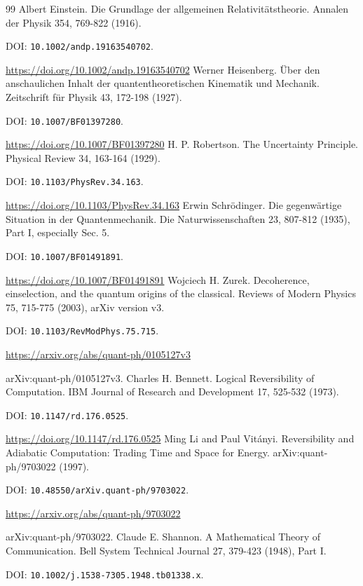 \clearpage
{}
\begin{thebibliography}{99}
Albert Einstein. Die Grundlage der allgemeinen Relativitätstheorie. Annalen der Physik 354, 769-822 (1916).
\par DOI: \nolinkurl{10.1002/andp.19163540702}.
\par\url{https://doi.org/10.1002/andp.19163540702}
Werner Heisenberg. Über den anschaulichen Inhalt der quantentheoretischen Kinematik und Mechanik. Zeitschrift für Physik 43, 172-198 (1927).
\par DOI: \nolinkurl{10.1007/BF01397280}.
\par\url{https://doi.org/10.1007/BF01397280}
H. P. Robertson. The Uncertainty Principle. Physical Review 34, 163-164 (1929).
\par DOI: \nolinkurl{10.1103/PhysRev.34.163}.
\par\url{https://doi.org/10.1103/PhysRev.34.163}
Erwin Schrödinger. Die gegenwärtige Situation in der Quantenmechanik. Die Naturwissenschaften 23, 807-812 (1935), Part I, especially Sec. 5.
\par DOI: \nolinkurl{10.1007/BF01491891}.
\par\url{https://doi.org/10.1007/BF01491891}
Wojciech H. Zurek. Decoherence, einselection, and the quantum origins of the classical. Reviews of Modern Physics 75, 715-775 (2003), arXiv version v3.
\par DOI: \nolinkurl{10.1103/RevModPhys.75.715}.
\par\url{https://arxiv.org/abs/quant-ph/0105127v3}
\par arXiv:quant-ph/0105127v3.
Charles H. Bennett. Logical Reversibility of Computation. IBM Journal of Research and Development 17, 525-532 (1973).
\par DOI: \nolinkurl{10.1147/rd.176.0525}.
\par\url{https://doi.org/10.1147/rd.176.0525}
Ming Li and Paul Vitányi. Reversibility and Adiabatic Computation: Trading Time and Space for Energy. arXiv:quant-ph/9703022 (1997).
\par DOI: \nolinkurl{10.48550/arXiv.quant-ph/9703022}.
\par\url{https://arxiv.org/abs/quant-ph/9703022}
\par arXiv:quant-ph/9703022.
Claude E. Shannon. A Mathematical Theory of Communication. Bell System Technical Journal 27, 379-423 (1948), Part I.
\par DOI: \nolinkurl{10.1002/j.1538-7305.1948.tb01338.x}.

\end{thebibliography}
